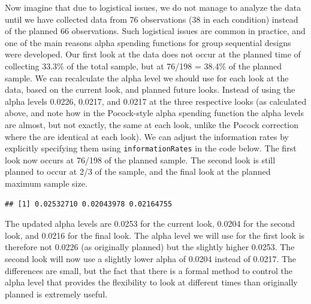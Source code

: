 \documentclass[
  oneside]{book}
\newenvironment{Shaded}{\begin{snugshade}}{\end{snugshade}}
\newcommand{\AttributeTok}[1]{\textcolor[rgb]{0.77,0.63,0.00}{#1}}
\newcommand{\DecValTok}[1]{\textcolor[rgb]{0.00,0.00,0.81}{#1}}
\newcommand{\FloatTok}[1]{\textcolor[rgb]{0.00,0.00,0.81}{#1}}
\newcommand{\FunctionTok}[1]{\textcolor[rgb]{0.00,0.00,0.00}{#1}}
\newcommand{\NormalTok}[1]{#1}
\newcommand{\OtherTok}[1]{\textcolor[rgb]{0.56,0.35,0.01}{#1}}
\newcommand{\SpecialCharTok}[1]{\textcolor[rgb]{0.00,0.00,0.00}{#1}}
\newcommand{\StringTok}[1]{\textcolor[rgb]{0.31,0.60,0.02}{#1}}
\begin{document}
Now imagine that due to logistical issues, we do not manage to analyze the data until we have collected data from 76 observations (38 in each condition) instead of the planned 66 observations. Such logistical issues are common in practice, and one of the main reasons alpha spending functions for group sequential designs were developed. Our first look at the data does not occur at the planned time of collecting 33.3\% of the total sample, but at 76/198 = 38.4\% of the planned sample. We can recalculate the alpha level we should use for each look at the data, based on the current look, and planned future looks. Instead of using the alpha levels 0.0226, 0.0217, and 0.0217 at the three respective looks (as calculated above, and note how in the Pocock-style alpha spending function the alpha levels are almost, but not exactly, the same at each look, unlike the Pocock correction where the are identical at each look). We can adjust the information rates by explicitly specifying them using \texttt{informationRates} in the code below. The first look now occurs at 76/198 of the planned sample. The second look is still planned to occur at 2/3 of the sample, and the final look at the planned maximum sample size.

\begin{Shaded}
\end{Shaded}

\begin{verbatim}
## [1] 0.02532710 0.02043978 0.02164755
\end{verbatim}

The updated alpha levels are 0.0253 for the current look, 0.0204 for the second look, and 0.0216 for the final look. The alpha level we will use for the first look is therefore not 0.0226 (as originally planned) but the slightly higher 0.0253. The second look will now use a slightly lower alpha of 0.0204 instead of 0.0217. The differences are small, but the fact that there is a formal method to control the alpha level that provides the flexibility to look at different times than originally planned is extremely useful.
\end{document}

